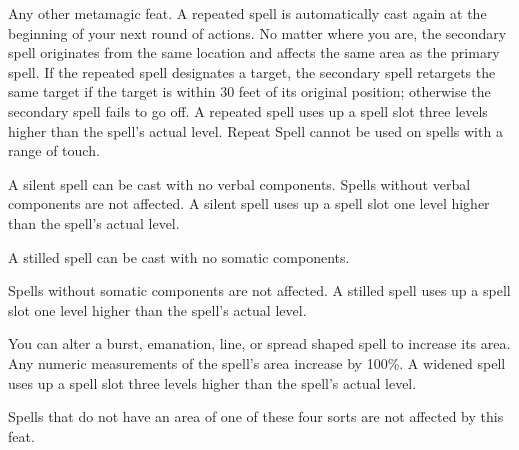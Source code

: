 {Any other metamagic feat.}
{A repeated spell is automatically cast again at the beginning of your next round of actions. No matter where you are, the secondary spell originates from the same location and affects the same area as the primary spell. If the repeated spell designates a target, the secondary spell retargets the same target if the target is within 30 feet of its original position; otherwise the secondary spell fails to go off. A repeated spell uses up a spell slot three levels higher than the spell's actual level. Repeat Spell cannot be used on spells with a range of touch.}

{A silent spell can be cast with no verbal components. Spells without verbal components are not affected. A silent spell uses up a spell slot one level higher than the spell's actual level.}

{A stilled spell can be cast with no somatic components.

Spells without somatic components are not affected. A stilled spell uses up a spell slot one level higher than the spell's actual level.}

{You can alter a burst, emanation, line, or spread shaped spell to increase its area. Any numeric measurements of the spell's area increase by 100\%. A widened spell uses up a spell slot three levels higher than the spell's actual level.

Spells that do not have an area of one of these four sorts are not affected by this feat.}
